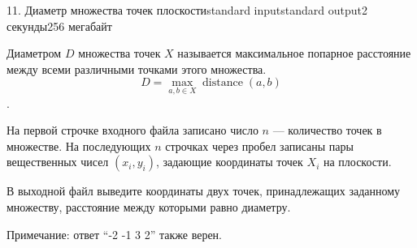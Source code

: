 \begin{problem}{11. Диаметр множества точек плоскости}{standard input}{standard output}{2 секунды}{256 мегабайт}

Диаметром $D$ множества точек $X$ называется максимальное попарное расстояние между всеми различными точками этого множества.
$$ D = \max\limits_{a, b \in X} \operatorname{distance}(a, b) $$.

\InputFile

На первой строчке входного файла записано число $n$ — количество точек в множестве. На последующих $n$ строчках через пробел записаны пары вещественных чисел $(x_i, y_i)$, задающие координаты точек $X_i$ на плоскости.

\OutputFile
В выходной файл выведите координаты двух точек, принадлежащих заданному множеству, расстояние между которыми равно диаметру.

\Examples

\begin{example}%
%
\end{example}

\begin{example}
%
\end{example}

Примечание: ответ “-2 -1 3 2” также верен.

\end{problem}
